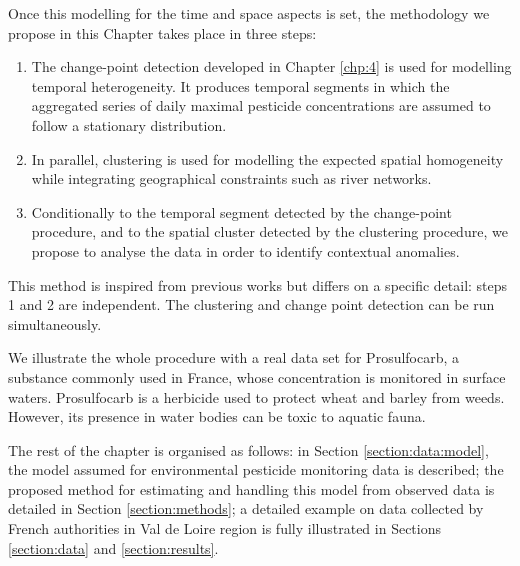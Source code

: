 Once this modelling for the time and space aspects is set, the methodology we propose in this Chapter takes place in three steps: 
\begin{enumerate}
\item The change-point detection developed in Chapter \ref{chp:4} is used for modelling temporal heterogeneity. It produces temporal segments in which the aggregated series of daily maximal pesticide concentrations are assumed to follow a stationary distribution. 
\item In parallel, clustering is used for modelling the expected spatial homogeneity while integrating geographical constraints such as river networks. 
\item Conditionally to the temporal segment detected by the change-point procedure, and to the spatial cluster detected by the clustering procedure, we propose to analyse the data in order to identify contextual anomalies. 
\end{enumerate}
This method is inspired from previous works \citep{Laroche2022} but differs on a specific detail: steps 1 and 2 are independent. The clustering and change point detection can be run simultaneously. 

We illustrate the whole procedure with a real data set for Prosulfocarb, a substance commonly used in France, whose concentration is monitored in surface waters. Prosulfocarb is a herbicide used to protect wheat and barley from weeds. However, its presence in water bodies can be toxic to aquatic fauna. 

The rest of the chapter is organised as follows: in Section \ref{section:data:model}, the model assumed for environmental pesticide monitoring data is described; the proposed method for estimating and handling this model from observed data is detailed in Section \ref{section:methods}; a detailed example on data collected by French authorities in Val de Loire region is fully illustrated in Sections \ref{section:data} and \ref{section:results}. 




